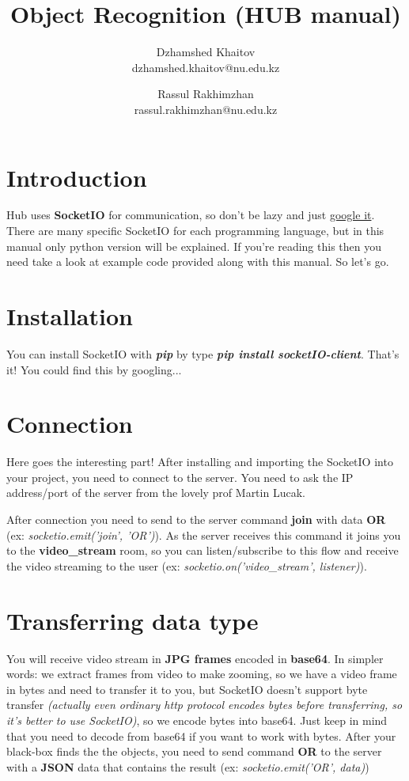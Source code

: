 \documentclass[10pt]{article}
\title {
	Object Recognition (HUB manual)
}
\date {}
\author {
	Dzhamshed Khaitov\\
	dzhamshed.khaitov@nu.edu.kz
	\and
	Rassul Rakhimzhan\\
	rassul.rakhimzhan@nu.edu.kz
}
\begin{document}
		
\maketitle

\section{Introduction}

Hub uses \textbf{SocketIO} for communication, so don't be lazy and just \href{http://www.justfuckinggoogleit.com/search/socketio}{google it}. There are many specific SocketIO for each programming language, but in this manual only python version will be explained. If you're reading this then you need take a look at example code provided along with this manual. So let's go.

\section{Installation}
You can install SocketIO with \textbf{\textit{pip}} by type \textbf{\textit{pip install socketIO-client}}. That's it! You could find this by googling...

\section{Connection}
Here goes the interesting part! After installing and importing the SocketIO into your project, you need to connect to the server. You need to ask the IP address/port of the server from the lovely prof Martin Lucak.
\par
After connection you need to send to the server command \textbf{join} with data \textbf{OR} (ex: \textit{socketio.emit('join', 'OR')}). As the server receives this command it joins you to the \textbf{video\_stream} room, so you can listen/subscribe to this flow and receive the video streaming to the user (ex: \textit{socketio.on('video\_stream', listener)}).

\section{Transferring data type}
You will receive video stream in \textbf{JPG frames} encoded in \textbf{base64}. In simpler words: we extract frames from video to make zooming, so we have a video frame in bytes and need to transfer it to you, but SocketIO doesn't support byte transfer \textit{(actually even ordinary http protocol encodes bytes before transferring, so it's better to use SocketIO)}, so we encode bytes into base64. Just keep in mind that you need to decode from base64 if you want to work with bytes.
After your black-box finds the the objects, you need to send command \textbf{OR} to the server with a \textbf{JSON} data that contains the result (ex: \textit{socketio.emit('OR', data)})
\end{document}
